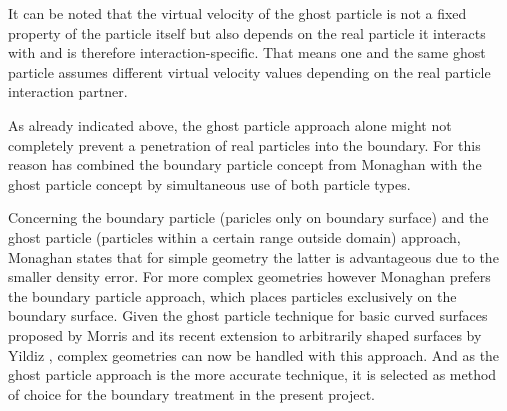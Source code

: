 \documentclass{report}
\begin{document}
\begin{itemize}
\begin{itemize}
\end{itemize}
It can be noted that the virtual velocity of the ghost particle is not a fixed property of the particle itself but also depends on the real particle it interacts with and is therefore interaction-specific. That means one and the same ghost particle assumes different virtual velocity values depending on the real particle interaction partner.

\end{itemize}

As already indicated above, the ghost particle approach alone might not completely prevent a penetration of real particles into the boundary. For this reason \cite{Liu2002} has combined the boundary particle concept from Monaghan with the ghost particle concept by simultaneous use of both particle types.  %

Concerning the boundary particle (paricles only on boundary surface) and the ghost particle (particles within a certain range outside domain) approach, Monaghan \cite{Monaghan2005} states that for simple geometry the latter is advantageous due to the smaller density error. For more complex geometries however Monaghan prefers the boundary particle approach, which places particles exclusively on the boundary surface.
Given the ghost particle technique for basic curved surfaces proposed by Morris \cite{Morris1997, Zhu1999} and its recent extension to arbitrarily shaped surfaces by Yildiz \cite{Yildiz2009}, complex geometries can now be handled with this approach. And as the ghost particle approach is the more accurate technique, it is selected as method of choice for the boundary treatment in the present project.
\end{document}
